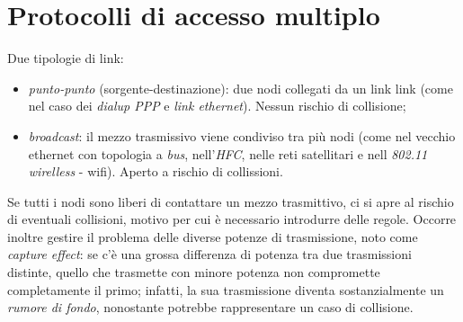 \section{Protocolli di accesso multiplo}
Due tipologie di link:
\begin{itemize}
	\item \textit{punto-punto} (sorgente-destinazione): due nodi collegati da un link link (come nel caso dei \textit{dialup PPP} e \textit{link ethernet}). Nessun rischio di collisione;
	\item \textit{broadcast}: il mezzo trasmissivo viene condiviso tra più nodi (come nel vecchio ethernet con topologia a \textit{bus}, nell'\textit{HFC}, nelle reti satellitari e nell \textit{802.11 wirelless} - wifi). Aperto a rischio di collissioni.
\end{itemize}
Se tutti i nodi sono liberi di contattare un mezzo trasmittivo, ci si apre al rischio di eventuali collisioni, motivo per cui è necessario introdurre delle regole. Occorre inoltre gestire il problema delle diverse potenze di trasmissione, noto come \textit{capture effect}: se c'è una grossa differenza di potenza tra due trasmissioni distinte, quello che trasmette con minore potenza non compromette completamente il primo; infatti, la sua trasmissione diventa sostanzialmente un \textit{rumore di fondo}, nonostante potrebbe rappresentare un caso di collisione.

